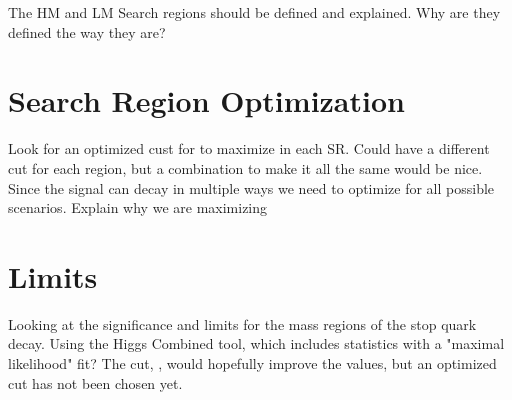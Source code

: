The HM and LM Search regions should be defined and explained. Why are they defined the way they are?

\section{Search Region Optimization}
\label{sec:dphisrapp}

Look for an optimized cust for \dphisr to maximize \srootb{} in each SR. Could have a different cut for each region, but a combination to make it all the same would be nice. Since the signal can decay in multiple ways we need to optimize for all possible scenarios. Explain why we are maximizing \srootb

\section{Limits}
\label{sec:LimitswCut}

Looking at the significance and limits for the mass regions of the stop quark decay. Using the Higgs Combined tool, which includes statistics with a "maximal likelihood" fit? The cut, \dphisr, would hopefully improve the values, but an optimized cut has not been chosen yet. 